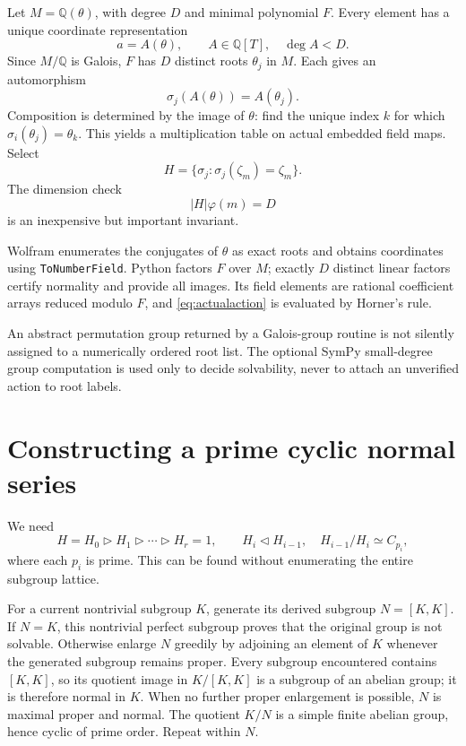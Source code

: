 \documentclass[11pt,letterpaper]{article}
\newcommand{\Q}{\mathbb Q}\newcommand{\C}{\mathbb C}
\newcommand{\code}[1]{\texttt{#1}}
\theoremstyle{definition}\newtheorem{definition}[theorem]{Definition}
\theoremstyle{remark}\newtheorem{remark}[theorem]{Remark}
\begin{document}
Let \(M=\Q(\theta)\), with degree \(D\) and minimal polynomial \(F\).
Every element has a unique coordinate representation
\[
            a=A(\theta),\qquad A\in\Q[T],\quad \deg A<D.
\]
Since \(M/\Q\) is Galois, \(F\) has \(D\) distinct roots \(\theta_j\) in
\(M\). Each gives an automorphism
\begin{equation}
             \sigma_j(A(\theta))=A(\theta_j).                \label{eq:actualaction}
\end{equation}
Composition is determined by the image of \(\theta\): find the unique index
\(k\) for which \(\sigma_i(\theta_j)=\theta_k\). This yields a multiplication
table on actual embedded field maps. Select
\[
              H=\{\sigma_j:\sigma_j(\zeta_m)=\zeta_m\}.
\]
The dimension check
\begin{equation}
                      |H|\varphi(m)=D                       \label{eq:dimension}
\end{equation}
is an inexpensive but important invariant.

Wolfram enumerates the conjugates of \(\theta\) as exact roots and obtains
coordinates using \code{ToNumberField}. Python factors \(F\) over \(M\);
exactly \(D\) distinct linear factors certify normality and provide all
images. Its field elements are rational coefficient arrays reduced modulo
\(F\), and \eqref{eq:actualaction} is evaluated by Horner's rule.

An abstract permutation group returned by a Galois-group routine is not
silently assigned to a numerically ordered root list. The optional SymPy
small-degree group computation is used only to decide solvability, never
to attach an unverified action to root labels.

\section{Constructing a prime cyclic normal series}

We need
\begin{equation}
 H=H_0\triangleright H_1\triangleright\cdots
     \triangleright H_r=1,
 \qquad H_i\triangleleft H_{i-1},\quad
 H_{i-1}/H_i\simeq C_{p_i},                                  \label{eq:chain}
\end{equation}
where each \(p_i\) is prime. This can be found without enumerating the entire
subgroup lattice.

For a current nontrivial subgroup \(K\), generate its derived subgroup
\(N=[K,K]\). If \(N=K\), this nontrivial perfect subgroup proves that the
original group is not solvable. Otherwise enlarge \(N\) greedily by adjoining
an element of \(K\) whenever the generated subgroup remains proper.
Every subgroup encountered contains \([K,K]\), so its quotient image in
\(K/[K,K]\) is a subgroup of an abelian group; it is therefore normal in
\(K\). When no further proper enlargement is possible, \(N\) is maximal
proper and normal. The quotient \(K/N\) is a simple finite abelian group,
hence cyclic of prime order. Repeat within \(N\).
\end{document}
